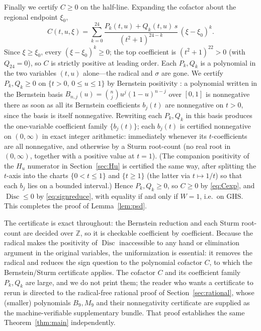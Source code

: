 \documentclass[11pt]{article}
\theoremstyle{plain}
\theoremstyle{definition}
\newcommand{\Disc}{\operatorname{Disc}}
\begin{document}
Finally we certify $C\ge0$ on the half-line. Expanding the cofactor about the regional endpoint $\xi_0$,
\begin{equation}\label{eq:Cexp}
  C(t,u,\xi)=\sum_{k=0}^{24}\frac{P_k(t,u)+Q_k(t,u)\,s}{(t^2+1)^{24-k}}\,(\xi-\xi_0)^k .
\end{equation}
Since $\xi\ge\xi_0$, every $(\xi-\xi_0)^k\ge0$; the top coefficient is $(t^2+1)^{22}>0$ (with $Q_{24}=0$), so
$C$ is strictly positive at leading order. Each $P_k,Q_k$ is a polynomial in the two variables $(t,u)$
alone---the radical and $\sigma$ are gone. We certify $P_k,Q_k\ge0$ on $\{t>0,\,0\le u\le1\}$ by Bernstein
positivity \cite{PowersReznick,Polya}: a polynomial written in the Bernstein basis
$B_{n,j}(u)=\binom{n}{j}u^j(1-u)^{n-j}$ over $[0,1]$ is nonnegative there as soon as all its Bernstein
coefficients $b_j(t)$ are nonnegative on $t>0$, since the basis is itself nonnegative. Rewriting each $P_k,Q_k$
in this basis produces the one-variable coefficient family $\{b_j(t)\}$; each $b_j(t)$ is certified nonnegative
on $(0,\infty)$ in exact integer arithmetic: immediately whenever its $t$-coefficients are all nonnegative,
and otherwise by a Sturm root-count (no real root in $(0,\infty)$, together with a positive value at $t=1$).
(The companion positivity of the $H_u$ numerator in Section~\ref{sec:Hu} is certified the same way, after
splitting the $t$-axis into the charts $\{0<t\le1\}$ and $\{t\ge1\}$ (the latter via $t\mapsto1/t$) so that
each $b_j$ lies on a bounded interval.) Hence $P_k,Q_k\ge0$, so $C\ge0$ by
\eqref{eq:Cexp}, and $\Disc\le0$ by \eqref{eq:signreduce}, with equality if and only if $W=1$, i.e.\ on GHS.
This completes the proof of Lemma~\ref{lem:psd}.

\medskip
The certificate is exact throughout: the Bernstein reduction and each Sturm root-count \cite{BasuPollackRoy}
are decided over $\mathbb Z$, so it is checkable coefficient by coefficient. Because the radical makes the
positivity of $\Disc$ inaccessible to any hand or elimination argument in the original variables, the
uniformization is essential: it removes the radical and reduces the sign question to the polynomial cofactor
$C$, to which the Bernstein/Sturm certificate applies. The cofactor $C$ and its coefficient family $P_k,Q_k$
are large, and we do not print them; the reader who wants a certificate to rerun is directed to the
radical-free rational proof of Section~\ref{sec:rational}, whose (smaller) polynomials $B_9,M_9$ and their
nonnegativity certificate are supplied as the machine-verifiable supplementary bundle. That proof establishes
the same Theorem~\ref{thm:main} independently.
\end{document}
